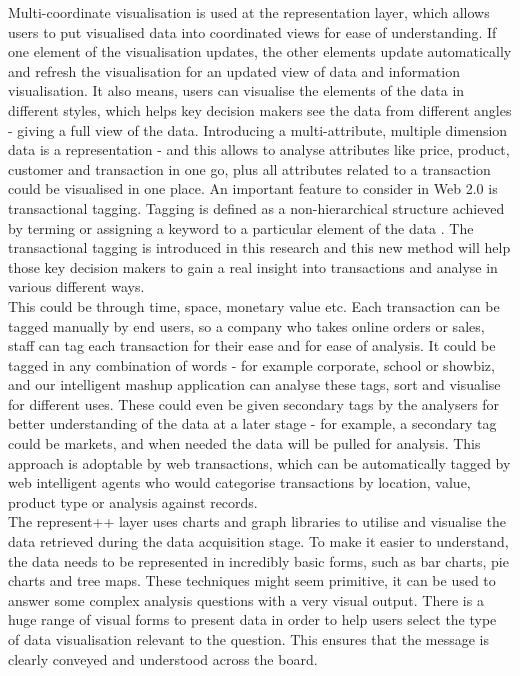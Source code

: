 Multi-coordinate visualisation is used at the representation layer, which allows users to put visualised data into coordinated views for ease of understanding. If one element of the visualisation updates, the other elements update automatically and refresh the visualisation for an updated view of data and information visualisation. It also means, users can visualise the elements of the data in different styles, which helps key decision makers see the data from different angles - giving a full view of the data. Introducing a multi-attribute, multiple dimension data is a representation - and this allows to analyse attributes like price, product, customer and transaction in one go, plus all attributes related to a transaction could be visualised in one place. An important feature to consider in Web 2.0 is transactional tagging. Tagging is defined as a non-hierarchical structure achieved by terming or assigning a keyword to a particular element of the data \cite{golder2006usage}. The transactional tagging is introduced in this research and this new method will help those key decision makers to gain a real insight into transactions and analyse in various different ways.\\

This could be through time, space, monetary value etc. Each transaction can be tagged manually by end users, so a company who takes online orders or sales, staff can tag each transaction for their ease and for ease of analysis. It could be tagged in any combination of words - for example corporate, school or showbiz, and our intelligent mashup application can analyse these tags, sort and visualise for different uses. These could even be given secondary tags by the analysers for better understanding of the data at a later stage - for example, a secondary tag could be markets, and when needed the data will be pulled for analysis. This approach is adoptable by web transactions, which can be automatically tagged by web intelligent agents who would categorise transactions by location, value, product type or analysis against records.\\

The represent++ layer uses charts and graph libraries to utilise and visualise the data retrieved during the data acquisition stage. To make it easier to understand, the data needs to be represented in incredibly basic forms, such as bar charts, pie charts and tree maps. These techniques might seem primitive, it can be used to answer some complex analysis questions with a very visual output. There is a huge range of visual forms to present data in order to help users select the type of data visualisation relevant to the question. This ensures that the message is clearly conveyed and understood across the board. \\

